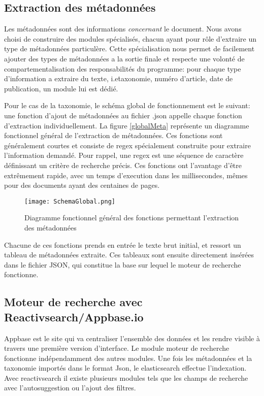 \subsection{Extraction des métadonnées}
Les métadonnées sont des informations \textit{concernant} le document.
Nous avons choisi de construire des modules spécialisés, chacun ayant pour rôle d'extraire un type de métadonnées particulère.
Cette spécialisation nous permet de facilement ajouter des types de métadonnées a la sortie finale et respecte une volonté de compartementalisation des responsabilités du programme: pour chaque type d'information a extraire du texte, i.e\. taxonomie, numéro d'article, date de publication, un module lui est dédié. 

Pour le cas de la taxonomie, le schéma global de fonctionnement est le suivant: une fonction d'ajout de métadonnées au fichier .json appelle chaque fonction d'extraction individuellement.
La figure \ref{globalMeta} représente un diagramme fonctionnel général de l'extraction de métadonnées. 
Ces fonctions sont généralement courtes et consiste de regex spécialement construite pour extraire l'information demandé.
Pour rappel, une regex est une séquence de caractère définissant un critère de recherche précis.
Ces fonctions ont l'avantage d'être extrêmement rapide, avec un temps d'execution dans les millisecondes, mêmes pour des documents ayant des centaines de pages. 

\begin{figure}[h!]
  \centering
	\texttt{[image: SchemaGlobal.png]}
	\caption[]{Diagramme fonctionnel général des fonctions permettant l'extraction des métadonnées}
  \label{fig:globalMeta}
\end{figure}

Chacune de ces fonctions prends en entrée le texte brut initial, et ressort un tableau de métadonnées extraite.
Ces tableaux sont ensuite directement insérées dans le fichier JSON, qui constitue la base sur lequel le moteur de recherche fonctionne.



\subsection{Moteur de recherche avec Reactivsearch/Appbase.io}
Appbase est le site qui va centraliser l'ensemble des données et les rendre visible à travers une première version d'interface.
Le module moteur de recherche fonctionne indépendamment des autres modules. Une fois les métadonnées et la taxonomie importés dans le format Json, le elasticsearch effectue l'indexation. Avec reactivsearch il existe plusieurs modules tels que les champs de recherche avec l'autosuggestion ou l'ajout des filtres.  

